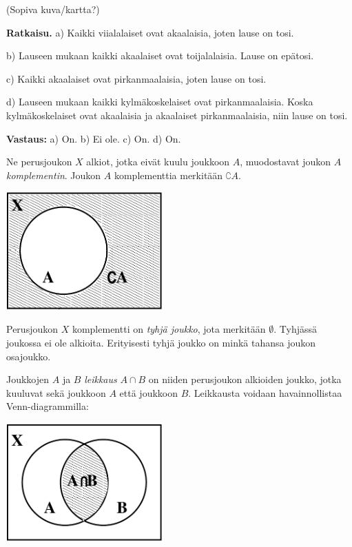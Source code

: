 (Sopiva kuva/kartta?)

{\bf Ratkaisu.}
a) Kaikki viialalaiset ovat akaalaisia, joten lause on
tosi.

b) Lauseen mukaan kaikki akaalaiset ovat toijalalaisia.
Lause on epätosi.

c) Kaikki akaalaiset ovat pirkanmaalaisia, joten lause on
tosi.

d) Lauseen mukaan kaikki kylmäkoskelaiset ovat
pirkanmaalaisia. Koska kylmäkoskelaiset ovat akaalaisia
ja akaalaiset pirkanmaalaisia, niin lause on tosi.

{\bf Vastaus:} a) On. b) Ei ole. c) On. d) On.

Ne perusjoukon $X$ alkiot, jotka eivät kuulu joukkoon $A$, muodostavat joukon $A$ {\em komplementin}. Joukon $A$ komplementtia merkitään $\complement A$.

\begin{center}
\includegraphics[width=6cm]{kuvat/komplementti}
\end{center}

Perusjoukon $X$ komplementti on {\em tyhjä joukko}, jota merkitään $\emptyset$. Tyhjässä joukossa ei ole alkioita. Erityisesti tyhjä joukko on minkä tahansa joukon osajoukko.


Joukkojen $A$ ja $B$ {\em leikkaus} $A\cap B$ on niiden perusjoukon alkioiden joukko, jotka kuuluvat sekä joukkoon $A$ että joukkoon $B$. Leikkausta voidaan havainnollistaa Venn-diagrammilla:

\begin{center}
\includegraphics[width=6cm]{kuvat/leikkaus}
\end{center}

